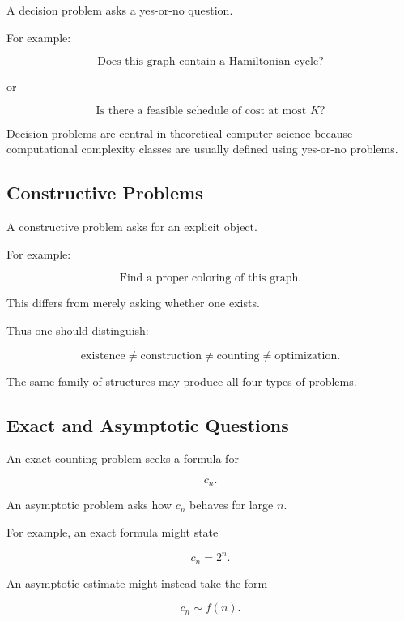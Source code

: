 A decision problem asks a yes-or-no question.

For example:

\[
\boxed{
\text{Does this graph contain a Hamiltonian cycle?}
}
\]

or

\[
\boxed{
\text{Is there a feasible schedule of cost at most }K?
}
\]

Decision problems are central in theoretical computer science because
computational complexity classes are usually defined using yes-or-no
problems.

\subsection{Constructive Problems}
\label{subsec:constructive-problems-discrete}

A constructive problem asks for an explicit object.

For example:

\[
\boxed{
\text{Find a proper coloring of this graph.}
}
\]

This differs from merely asking whether one exists.

Thus one should distinguish:

\[
\boxed{
\text{existence}
\neq
\text{construction}
\neq
\text{counting}
\neq
\text{optimization}.
}
\]

The same family of structures may produce all four types of problems.

\subsection{Exact and Asymptotic Questions}
\label{subsec:exact-asymptotic-discrete}

An exact counting problem seeks a formula for

\[
c_n.
\]

An asymptotic problem asks how \(c_n\) behaves for large \(n\).

For example, an exact formula might state

\[
c_n=2^n.
\]

An asymptotic estimate might instead take the form

\[
c_n\sim f(n).
\]

